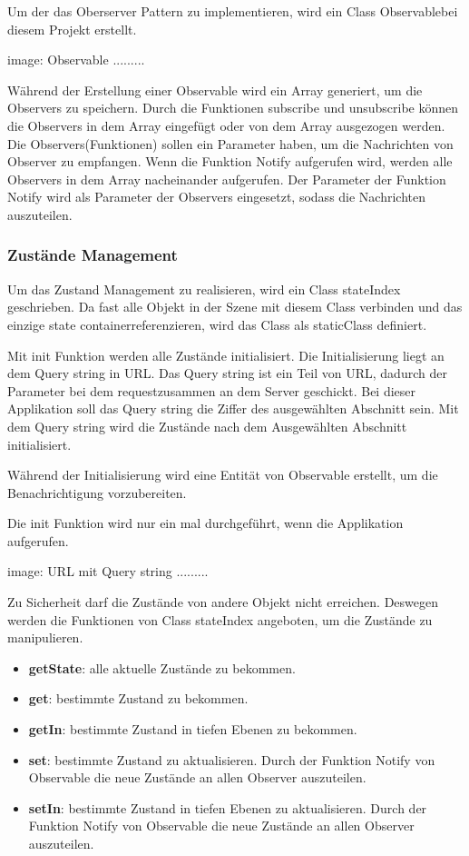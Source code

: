   Um der das Oberserver Pattern zu implementieren, wird ein Class \glqq Observable\grqq bei diesem Projekt erstellt.
  
  image: Observable .........
  
  Während der Erstellung einer Observable wird ein Array generiert, um die Observers zu speichern. Durch die Funktionen subscribe und unsubscribe können die Observers in dem Array eingefügt oder von dem Array ausgezogen werden. Die Observers(Funktionen) sollen ein Parameter haben, um die Nachrichten von Observer zu empfangen. Wenn die Funktion Notify aufgerufen wird, werden alle Observers in dem Array nacheinander aufgerufen. Der Parameter der Funktion Notify wird als Parameter der Observers eingesetzt, sodass die Nachrichten auszuteilen.
  
  
  \subsubsection{Zustände Management}
  
  Um das Zustand Management zu realisieren, wird ein Class stateIndex geschrieben. Da fast alle Objekt in der Szene mit diesem Class verbinden und das einzige \glqq state container\grqq referenzieren, wird das Class als \glqq static\grqq Class definiert.
  
  Mit init Funktion werden alle Zustände initialisiert. Die Initialisierung liegt an dem Query string in URL. Das Query string ist ein Teil von URL, dadurch der  Parameter bei dem \glqq request\grqq zusammen an dem Server geschickt. Bei dieser Applikation soll das Query string die Ziffer des ausgewählten Abschnitt sein. Mit dem Query string wird die Zustände nach dem Ausgewählten Abschnitt initialisiert.
  
  Während der Initialisierung wird eine Entität von Observable erstellt, um die Benachrichtigung vorzubereiten.
  
  Die init Funktion wird nur ein mal durchgeführt, wenn die Applikation aufgerufen.
  
  image: URL mit Query string .........
  
  Zu Sicherheit darf die Zustände von andere Objekt nicht erreichen. Deswegen werden die Funktionen von Class stateIndex angeboten, um die Zustände zu manipulieren.
  
  \begin{itemize}
      \item \textbf{getState}: alle aktuelle Zustände zu bekommen.
      \item \textbf{get}: bestimmte Zustand zu bekommen.
      \item \textbf{getIn}: bestimmte Zustand in tiefen Ebenen zu bekommen.
      \item \textbf{set}: bestimmte Zustand zu aktualisieren. Durch der Funktion Notify von Observable die neue Zustände an allen Observer auszuteilen.
      \item \textbf{setIn}: bestimmte Zustand in tiefen Ebenen zu aktualisieren. Durch der Funktion Notify von Observable die neue Zustände an allen Observer auszuteilen.
  \end{itemize}
  
